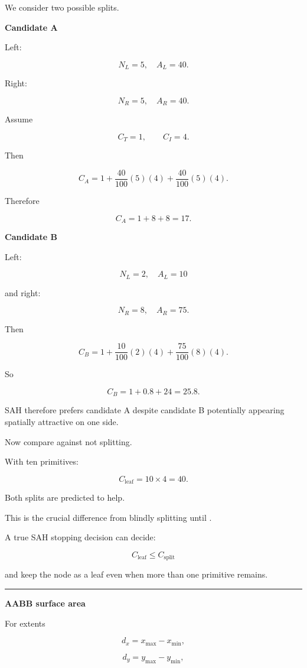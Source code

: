 We consider two possible splits.

\textbf{Candidate A}

Left:

\[
N_L=5,\quad A_L=40.
\]

Right:

\[
N_R=5,\quad A_R=40.
\]

Assume

\[
C_T=1,
\qquad
C_I=4.
\]

Then

\[
C_A
=
1+
\frac{40}{100}(5)(4)
+
\frac{40}{100}(5)(4).
\]

Therefore

\[
C_A=1+8+8=17.
\]

\textbf{Candidate B}

Left:

\[
N_L=2,\quad A_L=10
\]

and right:

\[
N_R=8,\quad A_R=75.
\]

Then

\[
C_B
=
1+
\frac{10}{100}(2)(4)
+
\frac{75}{100}(8)(4).
\]

So

\[
C_B=1+0.8+24=25.8.
\]

SAH therefore prefers candidate A despite candidate B potentially appearing spatially attractive on one side.

Now compare against not splitting.

With ten primitives:

\[
C_{\text{leaf}}
=
10\times4
=
40.
\]

Both splits are predicted to help.

This is the crucial difference from blindly splitting until .

A true SAH stopping decision can decide:

\[
C_{\text{leaf}}
\le C_{\text{split}}
\]

and keep the node as a leaf even when more than one primitive remains.

\begin{center}\rule{0.5\linewidth}{0.5pt}\end{center}

\textbf{AABB surface area}

For extents

\[
d_x=x_{\max}-x_{\min},
\]

\[
d_y=y_{\max}-y_{\min},
\]

